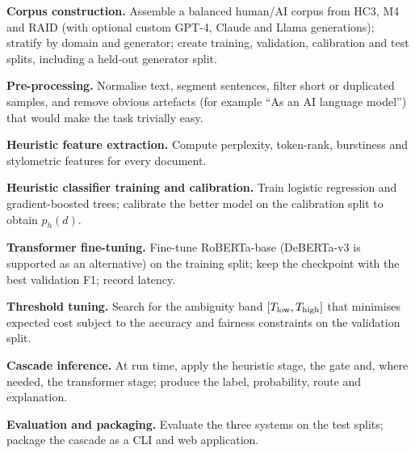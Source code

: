 \begin{description}[leftmargin=1.6cm,style=nextline,itemsep=3pt]
  \item[Step 1:] \textbf{Corpus construction.} Assemble a balanced human/AI
        corpus from HC3, M4 and RAID (with optional custom GPT-4, Claude and
        Llama generations); stratify by domain and generator; create training,
        validation, calibration and test splits, including a held-out
        generator split.
  \item[Step 2:] \textbf{Pre-processing.} Normalise text, segment sentences,
        filter short or duplicated samples, and remove obvious artefacts
        (for example ``As an AI language model'') that would make the task
        trivially easy.
  \item[Step 3:] \textbf{Heuristic feature extraction.} Compute perplexity,
        token-rank, burstiness and stylometric features for every document.
  \item[Step 4:] \textbf{Heuristic classifier training and calibration.} Train
        logistic regression and gradient-boosted trees; calibrate the better
        model on the calibration split to obtain $p_h(d)$.
  \item[Step 5:] \textbf{Transformer fine-tuning.} Fine-tune RoBERTa-base
        (DeBERTa-v3 is supported as an alternative) on the training split; keep
        the checkpoint with the best validation F1; record latency.
  \item[Step 6:] \textbf{Threshold tuning.} Search for the ambiguity band
        $[T_{\mathrm{low}},T_{\mathrm{high}}]$ that minimises expected cost subject to the accuracy
        and fairness constraints on the validation split.
  \item[Step 7:] \textbf{Cascade inference.} At run time, apply the heuristic
        stage, the gate and, where needed, the transformer stage; produce the
        label, probability, route and explanation.
  \item[Step 8:] \textbf{Evaluation and packaging.} Evaluate the three systems
        on the test splits; package the cascade as a CLI and web application.
\end{description}


